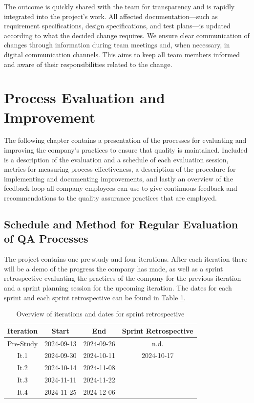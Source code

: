 \documentclass{article}
\begin{document}
The outcome is quickly shared with the team for transparency and is rapidly integrated into the project’s work. All affected documentation—such as requirement specifications, design specifications, and test plans—is updated according to what the decided change requires. We ensure clear communication of changes through information during team meetings and, when necessary, in digital communication channels. This aims to keep all team members informed and aware of their responsibilities related to the change.

\newpage
\section{Process Evaluation and Improvement}
The following chapter contains a presentation of the processes for evaluating and improving the company's practices to ensure that quality is maintained. Included is a description of the evaluation and a schedule of each evaluation session, metrics for measuring process effectiveness, a description of the procedure for implementing and documenting improvements, and lastly an overview of the feedback loop all company employees can use to give continuous feedback and recommendations to the quality assurance practices that are employed. 

\subsection{Schedule and Method for Regular Evaluation of QA Processes}
\label{schedule_and_method_for_regular_evaluation_of_qa_processes}
The project contains one pre-study and four iterations. After each iteration there will be a demo of the progress the company has made, as well as a sprint retrospective evaluating the practices of the company for the previous iteration and a sprint planning session for the upcoming iteration. The dates for each sprint and each sprint retrospective can be found in Table \ref{tab:iteration_table}. 

\begin{table}[H]
    \centering
    \caption{Overview of iterations and dates for sprint retrospective}
    \begin{tabular}{|c|c|c|c|}
    \hline
        \textbf{Iteration} & \textbf{Start} & \textbf{End} & \textbf{Sprint Retrospective}\\\hline
        Pre-Study & 2024-09-13 & 2024-09-26 & n.d. \\\hline
        It.1 & 2024-09-30 & 2024-10-11 & 2024-10-17 \\\hline
        It.2 & 2024-10-14 & 2024-11-08 & \\\hline
        It.3 & 2024-11-11 & 2024-11-22 & \\\hline
        It.4 & 2024-11-25 & 2024-12-06 & \\\hline
    \end{tabular}
    \label{tab:iteration_table}
\end{table}
\end{document}
